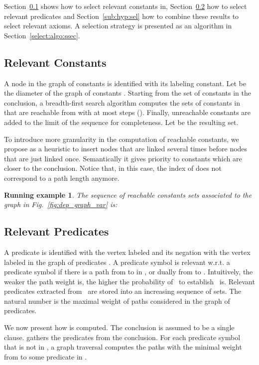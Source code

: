 \documentclass{acm_proc_article-sp}
\theoremstyle{nonumberplain}
\newtheorem{xpl}{Running example}}
\begin{document}
Section~\ref{sub:rel:var} shows how to select relevant constants in,
Section~\ref{sub:rel:pred} how to select relevant predicates and
Section~\ref{sub:hyp:sel} how to combine these results to select
relevant axioms. A selection strategy is presented as an algorithm in
Section~\ref{select:algo:ssec}.

\subsection{Relevant Constants}\label{sub:rel:var}
A node in the graph of constants  is identified with its 
labeling constant. Let  be the diameter of the graph of constants 
. Starting from the set  of constants in the 
conclusion, a breadth-first search algorithm computes the sets 
 of constants in  that are reachable from  
with at most  steps (). Finally, unreachable 
constants are added to the limit of the sequence  for completeness. Let  
be the resulting set.

To introduce more granularity in the computation of reachable
constants, we propose as a heuristic to insert nodes that are linked several 
times before nodes that are just linked once. Semantically it gives 
priority to constants which are closer to the conclusion. Notice 
that, in this case, the index  of  does not correspond 
to a path length anymore.


\begin{xpl}
The sequence of reachable constants sets associated to the
graph in Fig.~\ref{fig:dep_graph_var} is:

\end{xpl}

\subsection{Relevant Predicates}\label{sub:rel:pred}
A predicate  is identified with the vertex labeled  and its
negation with the vertex labeled 
 in the graph of predicates . A predicate 
symbol  is relevant w.r.t. a predicate symbol  if there is 
a path from  to  in , or dually from  
to . 
Intuitively, the weaker the path weight is, the 
higher the probability of~ to establish~ is. Relevant 
predicates extracted from~ are stored into
an increasing sequence  of sets.
The natural number  is the maximal weight of paths considered in
the graph of predicates. 


We now present how  is computed.
The conclusion is assumed to be a single clause.
 gathers the predicates from the conclusion.
For each predicate symbol  that is not in , a graph traversal
computes the paths with the minimal  weight  from  to some
predicate in .
\end{document}
